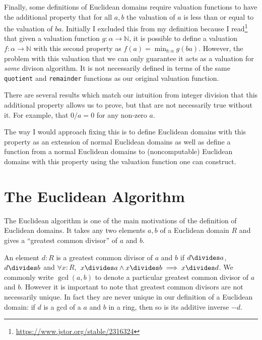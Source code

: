 \documentclass{article}
\newcommand{\N}{\ensuremath{\mathbb{N}}}
\renewcommand{\a}{\alpha}
\newcommand{\ct}{\texttt}
\begin{document}
Finally, some definitions of Euclidean domains require valuation functions to have the additional property that for all $a,b$ the valuation of $a$ is less than or equal to the valuation of $ba$. 
Initially I excluded this from my definition because I read\footnote{\url{https://www.jstor.org/stable/2316324}} that given a valuation function $g:\a \to \N$, it is possible to define a valuation $f:\a \to \N$ with this second property as $f(a)=\min_{b:\a}g(ba)$.
However, the problem with this valuation that we can only guarantee it acts as a valuation for \textit{some} divison algorithm.
It is not necessarily defined in terms of the same \ct{quotient} and \ct{remainder} functions as our original valuation function.

There are several results which match our intuition from integer division that this additional property allows us to prove, but that are not necessarily true without it.
For example, that $0/a=0$ for any non-zero $a$.

The way I would approach fixing this is to define Euclidean domains with this property as an extension of normal Euclidean domains as well as define a function from a normal Euclidean domains to (noncomputable) Euclidean domains with this property using the valuation function one can construct.



\section{The Euclidean Algorithm}

The Euclidean algorithm is one of the main motivations of the definition of Euclidean domains. 
It takes any two elements $a,b$ of a Euclidean domain $R$ and gives a ``greatest common divisor'' of $a$ and $b$. 

An element $d : R$ is a greatest common divisor of $a$ and $b$ if $d \divides a$, $d \divides b$ and $\forall x : R,$ $x \divides a \land x \divides b \implies x \divides d$.
We commonly write $\gcd(a,b)$ to denote a particular greatest common divisor of $a$ and $b$.
However it is important to note that greatest common divisors are not necessarily unique. In fact they are never unique in our definition of a Euclidean domain: if $d$ is a gcd of a $a$ and $b$ in a ring, then so is its additive inverse $-d$.
\end{document}

